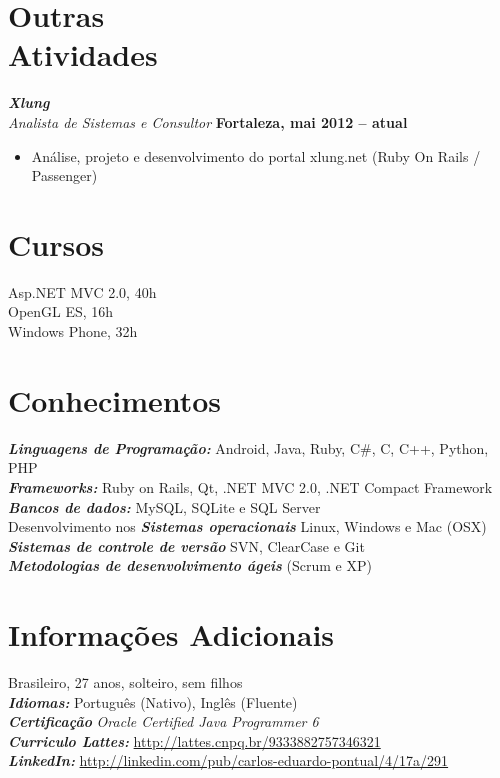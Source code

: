 \documentclass[margin, 10pt]{res} %
\begin{document}
\begin{resume}

\section{Outras \\ Atividades}

{\sl\bf Xlung} \\
{\sl Analista de Sistemas e Consultor} \hfill {\bf Fortaleza, mai 2012 -- atual}
\begin{itemize} \itemsep -2pt 
\item Análise, projeto e desenvolvimento do portal xlung.net (Ruby On Rails / Passenger)
\end{itemize} 

\section{Cursos}
Asp.NET MVC 2.0, 40h \\ 
OpenGL ES, 16h \\ 
Windows Phone, 32h


\section{Conhecimentos}
{\sl\bf Linguagens de Programação:}  Android, Java, Ruby, C\#, C, C++, Python, PHP \\
{\sl\bf Frameworks:} Ruby on Rails, Qt, .NET MVC 2.0, .NET Compact Framework \\
{\sl\bf Bancos de dados:} MySQL, SQLite e SQL Server \\
Desenvolvimento nos {\sl\bf Sistemas operacionais} Linux, Windows e Mac (OSX) \\
{\sl\bf Sistemas de controle de versão} SVN, ClearCase e Git \\
{\sl\bf Metodologias de desenvolvimento ágeis} (Scrum e XP)  \\

\section {Informações Adicionais}
Brasileiro, 27 anos, solteiro, sem filhos \\
{\sl\bf Idiomas:} Português (Nativo), Inglês (Fluente) \\
{\sl\bf Certificação} {\sl Oracle Certified Java Programmer 6} \\
{\sl\bf Curriculo Lattes:} \url{http://lattes.cnpq.br/9333882757346321} \\
{\sl\bf LinkedIn:} \url{http://linkedin.com/pub/carlos-eduardo-pontual/4/17a/291} \\


\end{resume}
\end{document}

